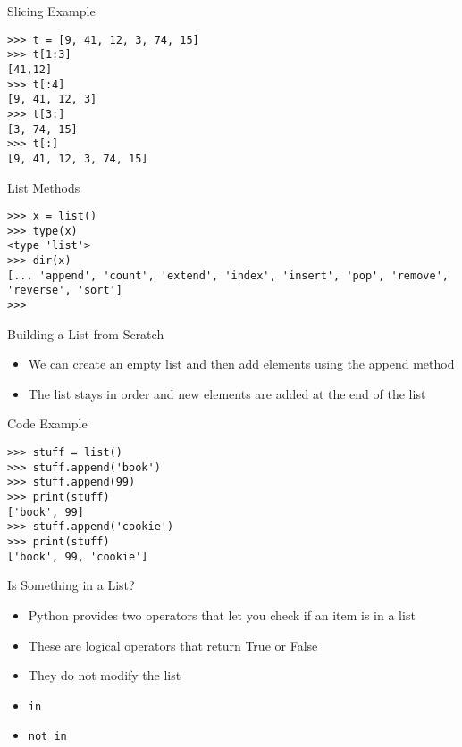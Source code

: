 \documentclass[serif, aspectratio=169]{beamer}
\begin{document}
\begin{frame}[fragile]{Slicing Example}
    \begin{lstlisting}
>>> t = [9, 41, 12, 3, 74, 15]
>>> t[1:3]
[41,12]
>>> t[:4]
[9, 41, 12, 3]
>>> t[3:]
[3, 74, 15]
>>> t[:]
[9, 41, 12, 3, 74, 15]
    \end{lstlisting}
\end{frame}

\begin{frame}[fragile]{List Methods}
    \begin{lstlisting}
>>> x = list()
>>> type(x)
<type 'list'>
>>> dir(x)
[... 'append', 'count', 'extend', 'index', 'insert', 'pop', 'remove', 'reverse', 'sort']
>>> 
    \end{lstlisting}
\end{frame}

\begin{frame}{Building a List from Scratch}
    \begin{itemize}
        \item We can create an empty list and then add elements using the append method
        \item The list stays in order and new elements are added at the end of the list
    \end{itemize}
\end{frame}

\begin{frame}[fragile]{Code Example}
    \begin{lstlisting}
>>> stuff = list()
>>> stuff.append('book')
>>> stuff.append(99)
>>> print(stuff)
['book', 99]
>>> stuff.append('cookie')
>>> print(stuff)
['book', 99, 'cookie']
    \end{lstlisting}
\end{frame}

\begin{frame}{Is Something in a List?}
    \begin{itemize}
        \item Python provides two operators that let you check if an item is in a list
        \item These are logical operators that return True or False
        \item They do not modify the list
        \item \texttt{\color{red}in}
        \item \texttt{{\color{red}not in}}
    \end{itemize}
\end{frame}
\end{document}

